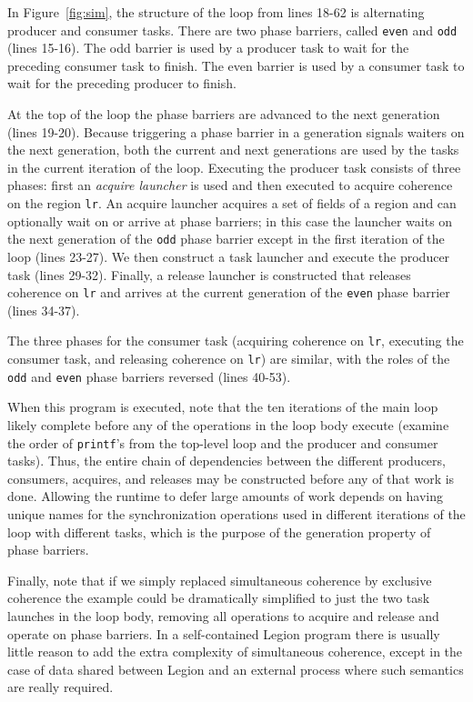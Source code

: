 In Figure~\ref{fig:sim}, the structure of the loop from lines 18-62 is alternating producer and consumer tasks.  There are two phase barriers, called {\tt even} and {\tt odd} (lines 15-16).  The odd barrier is used by a producer task to wait for the preceding consumer task to finish.  The even barrier is used by a consumer task to wait for the preceding producer
to finish.

At the top of the loop the phase barriers are advanced to the next generation (lines 19-20).  Because triggering a phase barrier in a generation signals waiters on the next generation, both the current and next generations are used by the tasks in the current iteration of the loop.  Executing the producer task consists of three phases:
first an {\em acquire launcher} is used and then executed to acquire coherence on the region {\tt lr}.  An acquire launcher acquires a set of fields of a region and can optionally wait on or arrive at phase barriers; in this case the launcher waits on the next generation of the {\tt odd}
phase barrier except in the first iteration of the loop (lines 23-27).  We then construct a task launcher and execute the producer task (lines 29-32).  Finally, a release launcher is constructed that releases coherence on {\tt lr} and arrives at the current generation of the
{\tt even} phase barrier (lines 34-37).

The three phases for the consumer task (acquiring coherence on {\tt lr}, executing the consumer task, and releasing coherence on {\tt lr}) are similar, with the roles of the {\tt odd} and {\tt even} phase barriers reversed (lines 40-53).

When this program is executed, note that the ten iterations of the main loop likely complete before any of the operations in the loop body execute (examine the order of {\tt printf}'s from the top-level loop and the producer and consumer tasks).  Thus, the entire chain of dependencies between the different producers, consumers, acquires, and releases may be constructed before any of that work is done.  Allowing the runtime to defer large amounts of work depends on having unique names for the synchronization operations used in different iterations of the loop
with different tasks, which is the purpose of the generation property of phase barriers.

Finally, note that if we simply replaced simultaneous coherence by exclusive coherence the example could be dramatically simplified to just the two task launches in the loop body, removing all operations to acquire and release and operate on phase barriers.  In a self-contained
Legion program there is usually little reason to add the extra complexity of simultaneous coherence, except in the case of data shared between Legion and an external process where such semantics are really required.

